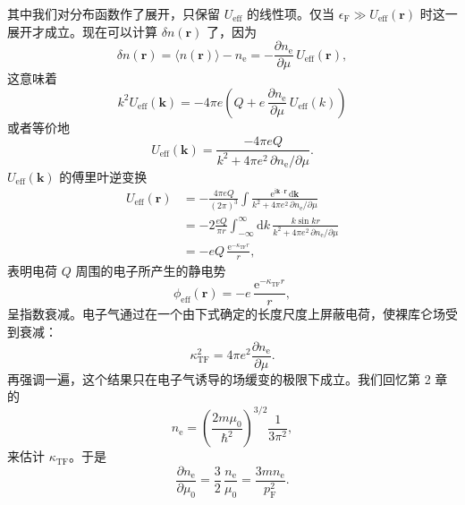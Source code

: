 其中我们对分布函数作了展开，只保留 $U_{\mathrm{eff}}$ 的线性项。仅当 $\epsilon_{\mathrm{F}}\gg U_{\mathrm{eff}}(\mathbf{r})$ 时这一展开才成立。现在可以计算 $\delta n(\mathbf{r})$ 了，因为
\begin{equation*}
\delta n(\mathbf{r})=\langle n(\mathbf{r})\rangle-n_{\mathrm{e}}=-\frac{\partial n_{\mathrm{e}}}{\partial\mu}\,U_{\mathrm{eff}}(\mathbf{r}),\tag{9.8}
\end{equation*}
这意味着
\begin{equation*}
k^2U_{\mathrm{eff}}(\mathbf{k})=-4\pi e\left(Q+e\,\frac{\partial n_{\mathrm{e}}}{\partial\mu}\,U_{\mathrm{eff}}(k)\right)\tag{9.9}
\end{equation*}
或者等价地
\begin{equation*}
U_{\mathrm{eff}}(\mathbf{k})=\frac{-4\pi eQ}{k^2+4\pi e^2\,\partial n_{\mathrm{e}}/\partial\mu}.\tag{9.10}
\end{equation*}
$U_{\mathrm{eff}}(\mathbf{k})$ 的傅里叶逆变换
\begin{equation*}
\begin{aligned}
U_{\mathrm{eff}}(\mathbf{r})&=-\frac{4\pi eQ}{(2\pi)^3}\int\frac{\mathrm{e}^{\mathrm{i}\mathbf{k}\cdot\mathbf{r}}\,\mathrm{d}\mathbf{k}}{k^2+4\pi e^2\,\partial n_{\mathrm{e}}/\partial\mu}\\
&=-2\frac{eQ}{\pi r}\int_{-\infty}^{\infty}\mathrm{d}k\,\frac{k\sin kr}{k^2+4\pi e^2\,\partial n_{\mathrm{e}}/\partial\mu}\\
&=-eQ\,\frac{\mathrm{e}^{-\kappa_{\mathrm{TF}}r}}{r},
\end{aligned}\tag{9.11}
\end{equation*}
表明电荷 $Q$ 周围的电子所产生的静电势
\begin{equation*}
\phi_{\mathrm{eff}}(\mathbf{r})=-e\,\frac{\mathrm{e}^{-\kappa_{\mathrm{TF}}r}}{r},\tag{9.12}
\end{equation*}
呈指数衰减。电子气通过在一个由下式确定的长度尺度上屏蔽电荷，使裸库仑场受到衰减：
\begin{equation*}
\kappa_{\mathrm{TF}}^2=4\pi e^2\frac{\partial n_{\mathrm{e}}}{\partial\mu}.\tag{9.13}
\end{equation*}
再强调一遍，这个结果只在电子气诱导的场缓变的极限下成立。我们回忆第 2 章的
\begin{equation*}
n_{\mathrm{e}}=\left(\frac{2m\mu_0}{\hbar^2}\right)^{3/2}\frac{1}{3\pi^2},\tag{9.14}
\end{equation*}
来估计 $\kappa_{\mathrm{TF}}$。于是
\begin{equation*}
\frac{\partial n_{\mathrm{e}}}{\partial\mu_0}=\frac{3}{2}\,\frac{n_{\mathrm{e}}}{\mu_0}=\frac{3mn_{\mathrm{e}}}{p_{\mathrm{F}}^2}.\tag{9.15}
\end{equation*}
